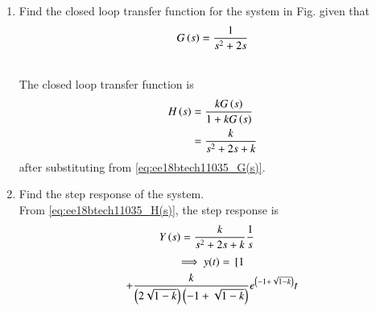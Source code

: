 \begin{enumerate}[label=\thesubsection.\arabic*.,ref=\thesubsection.\theenumi]

\item Find the closed loop transfer function for the system in Fig. \label{fig:ee18btech11035_block} given that
\begin{align}
\label{eq:ee18btech11035_G(s)}
G\left(s\right)=\frac{1}{s^2+2s}
\end{align}
%
\begin{figure}[!ht]
    \begin{center}
		\resizebox{\columnwidth}{!}{}
	\end{center}
\caption{}
\label{fig:ee18btech11035_block}
\end{figure}
\\
\solution The closed loop transfer function is
\begin{align}
H\left(s\right) &= \frac{kG\left(s\right)}{1+kG\left(s\right)}
\label{eq:ee18btech11035_4}
\\
 &= \frac{k}{s^2+2s+k}
\label{eq:ee18btech11035_H(s)}
\end{align}
after substituting from \eqref{eq:ee18btech11035_G(s)}.
\item Find the step response of the system.\\
\solution 
%
From \eqref{eq:ee18btech11035_H(s)}, the step response is 
\begin{align}
Y\left(s\right)
&=\frac{k}{s^2+2s+k}\frac{1}{s}
\label{eq:ee18btech11035_ys}
\end{align}
\begin{multline}
\implies      y(t) = \lsbrak{1}
\\ +
\frac{k}{\brak{2\sqrt{1-k}}\brak{-1+\sqrt{1-k}}}{e^{\brak{-1+\sqrt{1-k}}}t}

\end{multline}
\end{enumerate}
